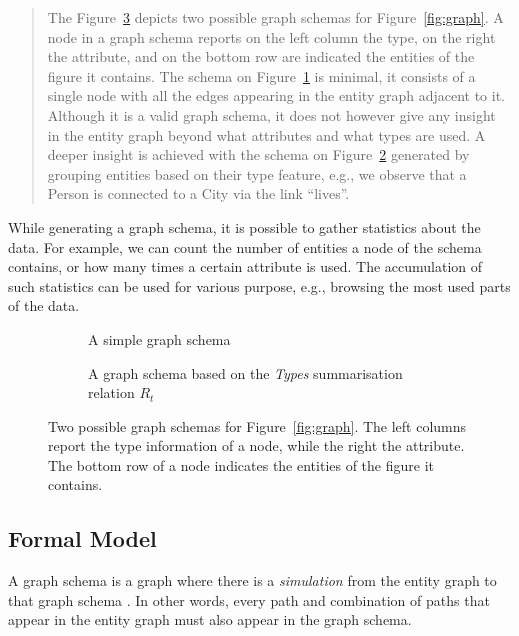 \begin{quote}
	The Figure~\ref{fig:schema-graphs} depicts two possible graph schemas for Figure~\ref{fig:graph}. A node in a graph schema reports on the left column the type, on the right the attribute, and on the bottom row are indicated the entities of the figure it contains.
	The schema on Figure~\ref{fig:sg1} is minimal, it consists of a single node with all the edges appearing in the entity graph adjacent to it. Although it is a valid graph schema, it does not however give any insight in the entity graph beyond what attributes and what types are used.
	A deeper insight is achieved with the schema on Figure~\ref{fig:sg2} generated by grouping entities based on their type feature, e.g., we observe that a Person is connected to a City via the link ``lives''.
\end{quote}

While generating a graph schema, it is possible to gather statistics about the data. For example, we can count the number of entities a node of the schema contains, or how many times a certain attribute is used. The accumulation of such statistics can be used for various purpose, e.g., browsing the most used parts of the data.

\begin{figure}
	\centering
	\begin{subfigure}{.42\textwidth}
		\centering
		\resizebox{\textwidth}{!}{
			
		}
		\caption{A simple graph schema}
		\label{fig:sg1}
	\end{subfigure}
	\quad
	\begin{subfigure}{.54\textwidth}
		\centering
		\resizebox{\textwidth}{!}{
			
		}
		\caption{A graph schema based on the \emph{Types} summarisation relation $R_t$}
		\label{fig:sg2}
	\end{subfigure}
	\caption{Two possible graph schemas for Figure~\ref{fig:graph}. The left columns report the type information of a node, while the right the attribute. The bottom row of a node indicates the entities of the figure it contains.}
	\label{fig:schema-graphs}
\end{figure}

\subsection{Formal Model}
\label{sec:gschema:formal-model}

A graph schema is a graph where there is a \emph{simulation} from the entity graph to that graph schema \cite{wang:2000:ags}. In other words, every path and combination of paths that appear in the entity graph must also appear in the graph schema.


